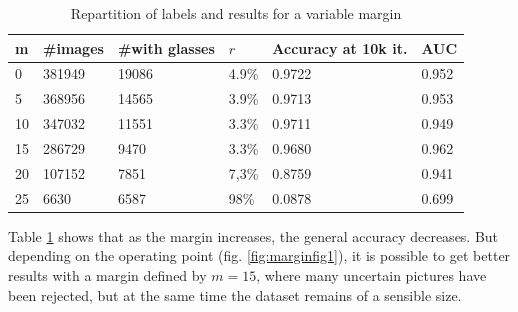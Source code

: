 \documentclass[a4paper]{article}
\begin{document}
            \begin{table}[H]
            \centering
           
            \begin{tabular}{|l|l|l|l|l|l|}
            \hline
            m & \#images & \#with glasses & $r$ & Accuracy at 10k it. & AUC   \\ \hline
            0      & 381949   & 19086          & 4.9\% & 0.9722              & 0.952 \\ \hline
            5     & 368956   & 14565          & 3.9\% & 0.9713              & 0.953 \\ \hline
            10     & 347032   & 11551          & 3.3\% & 0.9711              & 0.949 \\ \hline
            15     & 286729   & 9470           & 3.3\% & 0.9680              & 0.962 \\ \hline
            20     & 107152   & 7851           & 7,3\% & 0.8759              & 0.941 \\ \hline
            25     & 6630     & 6587           & 98\%  & 0.0878              &       0.699 \\ \hline
            \end{tabular}
            \caption{Repartition of labels and results for a variable margin}
            \label{table_margin}
            \end{table}
            Table \ref{table_margin} shows that as the margin increases, the general accuracy decreases. But depending on the operating point (fig. \ref{fig:marginfig1}), it is possible to get better results with a margin defined by $m=15$, where many uncertain pictures have been rejected, but at the same time the dataset remains of a sensible size.
\end{document}
